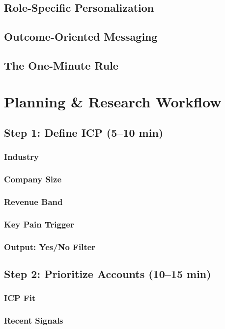    \subsection{Role-Specific Personalization}\mbox{}
    \subsection{Outcome-Oriented Messaging}\mbox{}
    \subsection{The One-Minute Rule}\mbox{}

\section{Planning \& Research Workflow}\mbox{}
    \subsection{Step 1: Define ICP (5--10 min)}\mbox{}
        \subsubsection{Industry}\mbox{}
        \subsubsection{Company Size}\mbox{}
        \subsubsection{Revenue Band}\mbox{}
        \subsubsection{Key Pain Trigger}\mbox{}
        \subsubsection{Output: Yes/No Filter}\mbox{}
    \subsection{Step 2: Prioritize Accounts (10--15 min)}\mbox{}
        \subsubsection{ICP Fit}\mbox{}
        \subsubsection{Recent Signals}\mbox{}
